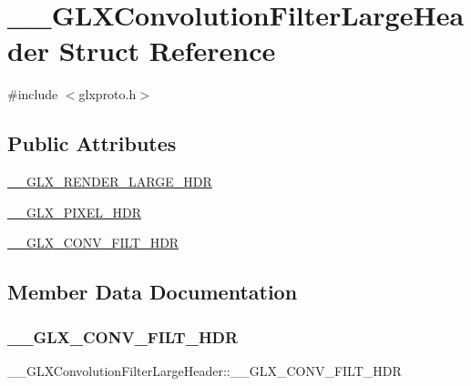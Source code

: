 \hypertarget{struct_____g_l_x_convolution_filter_large_header}{}\section{\+\_\+\+\_\+\+G\+L\+X\+Convolution\+Filter\+Large\+Header Struct Reference}
\label{struct_____g_l_x_convolution_filter_large_header}


{\ttfamily \#include $<$glxproto.\+h$>$}

\subsection*{Public Attributes}
\begin{DoxyCompactItemize}
\item 
\hyperlink{struct_____g_l_x_convolution_filter_large_header_a4fd437e33c3d61879cccf75d236535b7}{\+\_\+\+\_\+\+G\+L\+X\+\_\+\+R\+E\+N\+D\+E\+R\+\_\+\+L\+A\+R\+G\+E\+\_\+\+H\+DR}
\item 
\hyperlink{struct_____g_l_x_convolution_filter_large_header_ab300dc362b7e15ec3632d196ecfc6bc0}{\+\_\+\+\_\+\+G\+L\+X\+\_\+\+P\+I\+X\+E\+L\+\_\+\+H\+DR}
\item 
\hyperlink{struct_____g_l_x_convolution_filter_large_header_a2669945a4ebe9ce0f5a434971e53ea74}{\+\_\+\+\_\+\+G\+L\+X\+\_\+\+C\+O\+N\+V\+\_\+\+F\+I\+L\+T\+\_\+\+H\+DR}
\end{DoxyCompactItemize}


\subsection{Member Data Documentation}
\mbox{\label{struct_____g_l_x_convolution_filter_large_header_a2669945a4ebe9ce0f5a434971e53ea74}} 
\subsubsection{\texorpdfstring{\+\_\+\+\_\+\+G\+L\+X\+\_\+\+C\+O\+N\+V\+\_\+\+F\+I\+L\+T\+\_\+\+H\+DR}{\_\_GLX\_CONV\_FILT\_HDR}}
{\footnotesize\ttfamily \+\_\+\+\_\+\+G\+L\+X\+Convolution\+Filter\+Large\+Header\+::\+\_\+\+\_\+\+G\+L\+X\+\_\+\+C\+O\+N\+V\+\_\+\+F\+I\+L\+T\+\_\+\+H\+DR}

